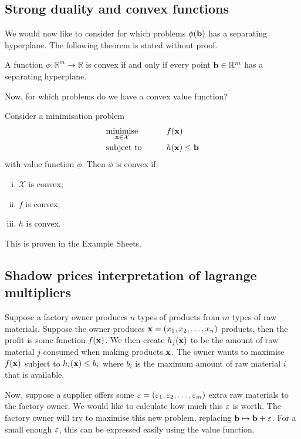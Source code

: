\subsection{Strong duality and convex functions}
We would now like to consider for which problems \( \phi(\vb b) \) has a separating hyperplane.
The following theorem is stated without proof.
\begin{theorem}
	A function \( \phi \colon \mathbb R^m \to \mathbb R \) is convex if and only if every point \( \vb b \in \mathbb R^m \) has a separating hyperplane.
\end{theorem}
Now, for which problems do we have a convex value function?
\begin{theorem}
	Consider a minimisation problem
	\begin{alignat*}{2}
		 & \underset{\vb x \in \mathcal X}{\text{minimise}} & \qquad & f(\vb x)            \\
		 & \text{subject to}                                &        & h(\vb x) \leq \vb b
	\end{alignat*}
	with value function \( \phi \).
	Then \( \phi \) is convex if:
	\begin{enumerate}[(i)]
		\item \( \mathcal X \) is convex;
		\item \( f \) is convex;
		\item \( h \) is convex.
	\end{enumerate}
\end{theorem}
\noindent This is proven in the Example Sheets.

\subsection{Shadow prices interpretation of lagrange multipliers}
Suppose a factory owner produces \( n \) types of products from \( m \) types of raw materials.
Suppose the owner produces \( \vb x = (x_1, x_2, \dots, x_n) \) products, then the profit is some function \( f(\vb x) \).
We then create \( h_j(\vb x) \) to be the amount of raw material \( j \) consumed when making products \( \vb x \).
The owner wants to maximise \( f(\vb x) \) subject to \( h_i(\vb x) \leq b_i \) where \( b_i \) is the maximum amount of raw material \( i \) that is available.

Now, suppose a supplier offers some \( \vb\varepsilon = (\varepsilon_1, \varepsilon_2, \dots, \varepsilon_m) \) extra raw materials to the factory owner.
We would like to calculate how much this \( \vb\varepsilon \) is worth.
The factory owner will try to maximise this new problem, replacing \( \vb b \mapsto \vb b + \vb\varepsilon \).
For a small enough \( \vb\varepsilon \), this can be expressed easily using the value function.

